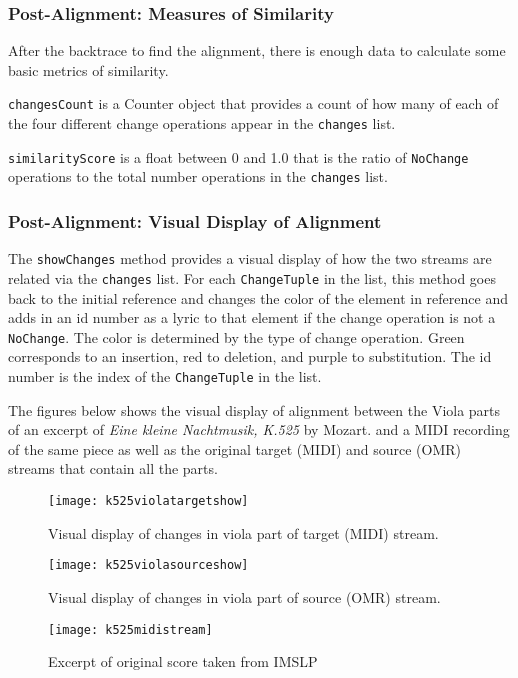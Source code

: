 \subsubsection{Post-Alignment: Measures of Similarity}
After the backtrace to find the alignment, there is enough data to calculate some basic metrics of similarity. 

\texttt{changesCount} is a Counter object that provides a count of how many of each of the four different change operations appear in the \texttt{changes} list. 

\texttt{similarityScore} is a float between 0 and 1.0 that is the ratio of \texttt{NoChange} operations to the total number operations in the \texttt{changes} list.
\subsubsection{Post-Alignment: Visual Display of Alignment}
The \texttt{showChanges} method provides a visual display of how the two streams are related via the \texttt{changes} list. For each \texttt{ChangeTuple} in the list, this method goes back to the initial reference and changes the color of the element in reference and adds in an id number as a lyric to that element if the change operation is not a \texttt{NoChange}. The color is determined by the type of change operation. Green corresponds to an insertion, red to deletion, and purple to substitution. The id number is the index of the \texttt{ChangeTuple} in the list. 

The figures below shows the visual display of alignment between the Viola parts of an excerpt of \textit{Eine kleine Nachtmusik, K.525} by Mozart. and a MIDI recording of the same piece as well as the original target (MIDI) and source (OMR) streams that contain all the parts.

\begin{figure}[!ht]
\centering
\texttt{[image: k525violatargetshow]}
\caption{Visual display of changes in viola part of target (MIDI) stream.}
\end{figure}

\begin{figure}[!ht]
\centering
\texttt{[image: k525violasourceshow]}
\caption{Visual display of changes in viola part of source (OMR) stream.}
\end{figure}

\begin{figure}[!ht]
\centering
\texttt{[image: k525midistream]}
\caption{Excerpt of original score taken from IMSLP}
\end{figure}

